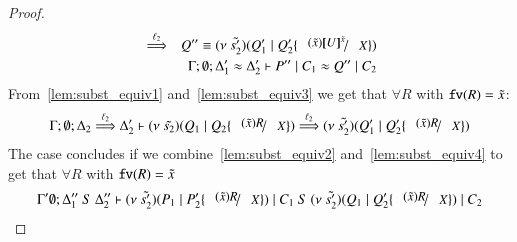 \begin{proof}
\begin{eqnarray}
		&\By{\ell_2}& Q'' \scong \newsp{\tilde{s_2'}}{Q_1' \Par Q_2' \subst{(\tilde{x}) \map{U}^{\tilde{x}}}{X}} \label{lem:subst_equiv3}
		\\
		&&\Gamma; \es; \Delta_1' \wb \Delta_2' \proves P'' \Par C_1 \wb Q'' \Par C_2 \label{lem:subst_equiv4}
	\end{eqnarray}
%
	\noi From~\ref{lem:subst_equiv1} and~\ref{lem:subst_equiv3} we get that $\forall R$ with $\mathtt{fv}(R) = \tilde{x}$:
%
	\begin{eqnarray*}
		\Gamma; \es; \Delta_2 \By{\ell_2} \Delta_2' \proves \newsp{\tilde{s_2}}{Q_1 \Par Q_2 \subst{(\tilde{x}) R}{X}} \By{\ell_2} \newsp{\tilde{s_2'}}{Q_1' \Par Q_2' \subst{(\tilde{x}) R}{X}}
	\end{eqnarray*}
%
	\noi The case concludes if we combine~\ref{lem:subst_equiv2} and~\ref{lem:subst_equiv4} to get that $\forall R$ with $\mathtt{fv}(R) = \tilde{x}$
%
	\begin{eqnarray*}
		\Gamma' \es; \Delta_1''\ S\ \Delta_2'' \proves \newsp{\tilde{s_2'}}{P_1 \Par P_2' \subst{(\tilde{x}) R}{X}} \Par C_1\ S\ \newsp{\tilde{s_2'}}{Q_1 \Par Q_2' \subst{(\tilde{x}) R}{X}} \Par C_2
	\end{eqnarray*}



\end{proof}
